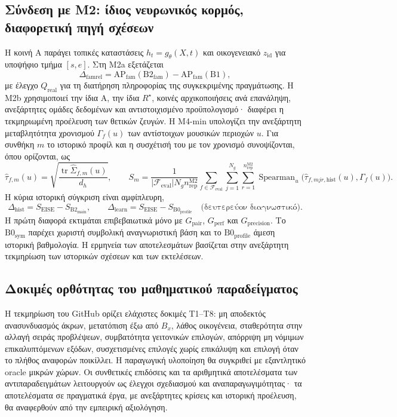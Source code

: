 \documentclass[11pt,a4paper]{article}
\begin{document}
\subsection{Σύνδεση με Μ2: ίδιος νευρωνικός κορμός, διαφορετική πηγή σχέσεων}
Η κοινή A παράγει τοπικές καταστάσεις $h_t=g_\theta(X,t)$ και οικογενειακό $z_{\mathrm{id}}$ για υποψήφιο τμήμα $[s,e]$. Στη Μ2a εξετάζεται
\[
 \Delta_{\mathrm{famrel}}=
 \mathrm{AP}_{\mathrm{fam}}(\mathrm{B2}_{\mathrm{fam}})
 -\mathrm{AP}_{\mathrm{fam}}(\mathrm{B1}),
\]
με έλεγχο $Q_{\mathrm{real}}$ για τη διατήρηση πληροφορίας της συγκεκριμένης πραγμάτωσης. Η Μ2b χρησιμοποιεί την ίδια A, την ίδια $R^\star$, κοινές αρχικοποιήσεις ανά επανάληψη, ανεξάρτητες ομάδες δεδομένων και αντιστοιχισμένο προϋπολογισμό· διαφέρει η τεκμηριωμένη προέλευση των θετικών ζευγών. Η Μ4-min υπολογίζει την ανεξάρτητη μεταβλητότητα χρονισμού $\Gamma_f(u)$ των αντίστοιχων μουσικών περιοχών $u$. Για συνθήκη $m$ το ιστορικό προφίλ και η συσχέτισή του με τον χρονισμό συνοψίζονται, όπου ορίζονται, ως
\[
 \widehat\tau_{f,m}(u)=\sqrt{\frac{\operatorname{tr}\widehat\Sigma_{f,m}(u)}{d_h}},\qquad
 S_m=\frac{1}{|\mathcal F_{\mathrm{eval}}|N_g n_{\mathrm{rep}}^{\mathrm{M2}}}
 \sum_{f\in\mathcal F_{\mathrm{eval}}}\sum_{j=1}^{N_g}
 \sum_{r=1}^{n_{\mathrm{rep}}^{\mathrm{M2}}}
 \operatorname{Spearman}_u\bigl(\widehat\tau_{f,mjr,\mathrm{hist}}(u),\Gamma_f(u)\bigr).
\]
Η κύρια ιστορική σύγκριση είναι αμφίπλευρη,
\[
 \Delta_{\mathrm{hist}}=S_{\mathrm{EISE}}-S_{\mathrm{B2}_{\mathrm{main}}},
 \qquad
 \Delta_{\mathrm{learn}}=S_{\mathrm{EISE}}-S_{\mathrm{B0}_{\mathrm{profile}}}
 \quad\text{(δευτερεύον διαγνωστικό)}.
\]
Η πρώτη διαφορά εκτιμάται επιβεβαιωτικά μόνο με $G_{\mathrm{pair}}$, $G_{\mathrm{perf}}$ και $G_{\mathrm{precision}}$. Το $\mathrm{B0}_{\mathrm{sym}}$ παρέχει χωριστή συμβολική αναγνωριστική βάση και το $\mathrm{B0}_{\mathrm{profile}}$ άμεση ιστορική βαθμολογία. Η ερμηνεία των αποτελεσμάτων βασίζεται στην ανεξάρτητη τεκμηρίωση των ιστορικών σχέσεων και των εκτελέσεων.

\subsection{Δοκιμές ορθότητας του μαθηματικού παραδείγματος}
Η τεκμηρίωση του GitHub ορίζει ελάχιστες δοκιμές T1--T8: μη αποδεκτός ανασυνδυασμός άκρων, μετατόπιση έξω από $B_x$, λάθος οικογένεια, σταθερότητα στην αλλαγή σειράς προβλέψεων, συμβατότητα γειτονικών επιλογών, απόρριψη μη νόμιμων επικαλυπτόμενων εξόδων, συσχετισμένες επιλογές χωρίς επικάλυψη και επιλογή όταν το πλήθος αναφορών ποικίλλει. Η παραγωγική υλοποίηση θα συγκριθεί με εξαντλητικό oracle μικρών χώρων. Οι συνθετικές επιδόσεις και τα αριθμητικά αποτελέσματα των αντιπαραδειγμάτων λειτουργούν ως έλεγχοι σχεδιασμού και αναπαραγωγιμότητας· τα αποτελέσματα σε πραγματικά έργα, με ανεξάρτητες κρίσεις και ιστορική προέλευση, θα αναφερθούν από την εμπειρική αξιολόγηση.
\end{document}

